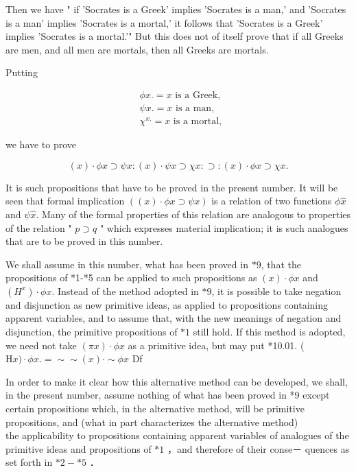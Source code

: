 \documentclass[10pt]{article}
\begin{document}
Then we have " if 'Socrates is a Greek' implies 'Socrates is a man,' and 'Socrates is a man' implies 'Socrates is a mortal,' it follows that 'Socrates is a Greek' implies 'Socrates is a mortal.'" But this does not of itself prove that if all Greeks are men, and all men are mortals, then all Greeks are mortals.

Putting

$$
\begin{aligned}
& \phi x .=x \text { is a Greek, } \\
& \psi x .=x \text { is a man, } \\
& \chi^{x .}=x \text { is a mortal, }
\end{aligned}
$$

we have to prove

$$
(x) \cdot \phi x \supset \psi x:(x) \cdot \psi x \supset \chi x: \supset:(x) \cdot \phi x \supset \chi x .
$$

It is such propositions that have to be proved in the present number. It will be seen that formal implication $((x) \cdot \phi x \supset \psi x)$ is a relation of two functions $\phi \hat{x}$ and $\psi \hat{x}$. Many of the formal properties of this relation are analogous to properties of the relation " $p \supset q$ " which expresses material implication; it is such analogues that are to be proved in this number.

We shall assume in this number, what has been proved in $* 9$, that the propositions of *1-*5 can be applied to such propositions as $(x) \cdot \phi x$ and $\left(H^{x}\right) \cdot \phi x$. Instead of the method adopted in $* 9$, it is possible to take negation and disjunction as new primitive ideas, as applied to propositions containing apparent variables, and to assume that, with the new meanings of negation and disjunction, the primitive propositions of $* 1$ still hold. If this method is adopted, we need not take $(\pi x) \cdot \phi x$ as a primitive idea, but may put *10.01. ( $\mathrm{H} x) \cdot \phi x .=\sim \sim(x) \cdot \sim \phi x$ Df

In order to make it clear how this alternative method can be developed, we shall, in the present number, assume nothing of what has been proved in *9 except certain propositions which, in the alternative method, will be primitive propositions, and (what in part characterizes the alternative method)\\
the applicability to propositions containing apparent variables of analogues of the primitive ideas and propositions of $* 1$ ，and therefore of their conse－ quences as set forth in $* 2-* 5$ ．
\end{document}
